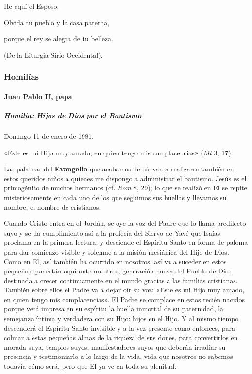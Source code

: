 \documentclass[]{article}
\let\oldparagraph\paragraph
\renewcommand{\paragraph}[1]{\oldparagraph{#1}\mbox{}}
\let\oldsubparagraph\subparagraph
\renewcommand{\subparagraph}[1]{\oldsubparagraph{#1}\mbox{}}
\begin{document}
He aquí el Esposo.

Olvida tu pueblo y la casa paterna,

porque el rey se alegra de tu belleza.

(De la Liturgia Sirio-Occidental).

\protect\hypertarget{_Toc448662881}{}{\protect\hypertarget{_Toc448690400}{}{}}

\subsubsection{Homilías}\label{homiluxedas-12}

\paragraph{Juan Pablo II, papa}\label{juan-pablo-ii-papa-1}

\subparagraph{Homilía: Hijos de Dios por el
Bautismo}\label{homiluxeda-hijos-de-dios-por-el-bautismo}

Domingo 11 de enero de 1981.

«Este es mi Hijo muy amado, en quien tengo mis complacencias» (\emph{Mt}
3, 17).

Las palabras del \textbf{Evangelio} que acabamos de oír van a realizarse
también en estos queridos niños a quienes me dispongo a administrar el
bautismo. Jesús es el primogénito de muchos hermanos (cf. \emph{Rom} 8,
29); lo que se realizó en El se repite misteriosamente en cada uno de
los que seguimos sus huellas y llevamos su nombre, el nombre de
cristianos.

Cuando Cristo entra en el Jordán, se oye la voz del Padre que lo llama
predilecto suyo y se da cumplimiento así a la profecía del Siervo de
Yavé que Isaías proclama en la primera lectura; y desciende el Espíritu
Santo en forma de paloma para dar comienzo visible y solemne a la misión
mesiánica del Hijo de Dios. Como en El, así también ha ocurrido en
nosotros; así va a suceder en estos pequeños que están aquí ante
nosotros, generación nueva del Pueblo de Dios destinada a crecer
continuamente en el mundo gracias a las familias cristianas. También
sobre ellos el Padre va a dejar oír su voz: «Este es mi Hijo muy amado,
en quien tengo mis complacencias». El Padre se complace en estos recién
nacidos porque verá impresa en su espíritu la huella inmortal de su
paternidad, la semejanza íntima y verdadera con su Hijo: hijos en el
Hijo. Y al mismo tiempo descenderá el Espíritu Santo invisible y a la
vez presente como entonces, para colmar a estas pequeñas almas de la
riqueza de sus dones, para convertirlos en morada suya, templos suyos,
manifestadores suyos que deberán irradiar su presencia y testimoniarlo a
lo largo de la vida, vida que nosotros no sabemos todavía cómo será,
pero que El ya ve en toda su plenitud.
\end{document}

